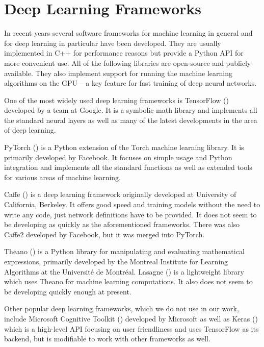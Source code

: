 \section{Deep Learning Frameworks}
In recent years several software frameworks for machine learning in general and for deep learning in particular have been developed. They are usually implemented in C++ for performance reasons but provide a Python API for more convenient use. All of the following libraries are open-source and publicly available. They also implement support for running the machine learning algorithms on the GPU -- a key feature for fast training of deep neural networks. \par
One of the most widely used deep learning frameworks is TensorFlow (\cite{martin_abadi_tensorflow:_2015}) developed by a team at Google. It is a symbolic math library and implements all the standard neural layers as well as many of the latest developments in the area of deep learning.  \par
PyTorch (\cite{paszke_automatic_2017}) is a Python extension of the Torch machine learning library. It is primarily developed by Facebook. It focuses on simple usage and Python integration and implements all the standard functions as well as extended tools for various areas of machine learning. \par
Caffe (\cite{jia_caffe:_2014}) is a deep learning framework originally developed at University of California, Berkeley. It offers good speed and training models without the need to write any code, just network definitions have to be provided. It does not seem to be developing as quickly as the aforementioned frameworks. There was also Caffe2 developed by Facebook, but it was merged into PyTorch. \par
Theano (\cite{theano_development_team_theano:_2016}) is a Python library for manipulating and evaluating mathematical expressions, primarily developed by the Montreal Institute for Learning Algorithms at the Université de Montréal. Lasagne (\cite{dieleman_lasagne:_2015}) is a lightweight library which uses Theano for machine learning computations. It also does not seem to be developing quickly enough at present. \par
Other popular deep learning frameworks, which we do not use in our work, include Microsoft Cognitive Toolkit (\cite{seide_cntk:_2016}) developed by Microsoft as well as Keras (\cite{chollet_keras_2015}) which is a high-level API focusing on user friendliness and uses TensorFlow as its backend, but is modifiable to work with other frameworks as well.


